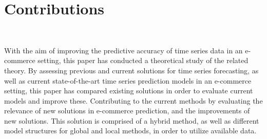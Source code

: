 
\section{Contributions}~\label{cont}
\label{section:Discussion:Contributions}


With the aim of improving the predictive accuracy of time series data in an e-commerce setting,
this paper has conducted a theoretical study of the related theory.
By assessing previous and current solutions for time series forecasting, as well as current state-of-the-art time series prediction models in an e-commerce setting,
this paper has compared existing solutions in order to evaluate current models and improve these.
Contributing to the current methods by evaluating the relevance of new solutions in e-commerce prediction,
and the improvements of new solutions.
This solution is comprised of a hybrid method, as well as different model structures for global and local methods,
in order to utilize available data.




\iffalse
  What are the main contributions made to the field and how significant are these contribution.
\fi
